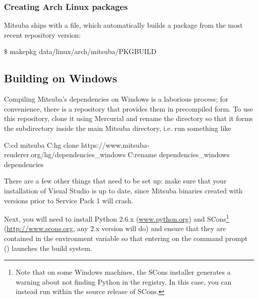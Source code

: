 \subsubsection{Creating Arch Linux packages}
Mitsuba ships with a  file, which automatically builds
a package from the most recent repository version:
\begin{shell}
$\text{\$}$ makepkg data/linux/arch/mitsuba/PKGBUILD
\end{shell}


\subsection{Building on Windows}
Compiling Mitsuba's dependencies on Windows is a laborious process; for convenience, there
is a repository that provides them in precompiled form. To use this repository, clone it
using Mercurial and rename the directory so that it forms the  subdirectory
inside the main Mitsuba directory, i.e. run something like
\begin{shell}
C:\>cd mitsuba
C:\mitsuba\>hg clone https://www.mitsuba-renderer.org/hg/dependencies_windows
C:\mitsuba\>rename dependencies_windows dependencies
\end{shell}
There are a few other things that need to be set up: make sure that your
installation of Visual Studio is up to date, since Mitsuba binaries created with versions
prior to Service Pack 1 will crash.

Next, you will need to install Python 2.6.x 
(\url{www.python.org}) and SCons\footnote{Note that on some Windows machines, the SCons 
installer generates a warning about not finding Python in the registry. In this case, you 
can instead run  within the source release of SCons.} 
(\url{http://www.scons.org}, any 2.x version will do) and ensure that they are contained in the  
environment variable so that entering  on the command prompt () 
launches the build system.

